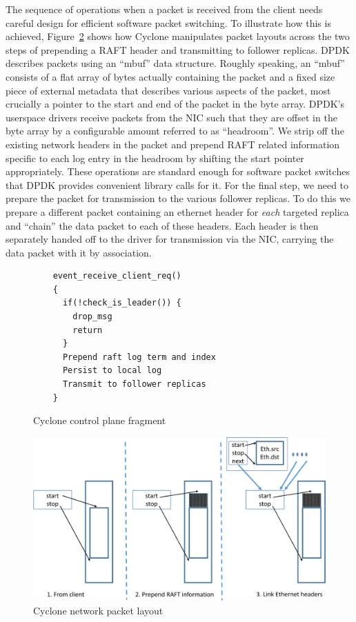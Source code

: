 \documentclass[pageno]{jpaper}
\begin{document}
The sequence of operations when a packet is received from the client needs
careful design for efficient software packet switching. To illustrate how this
is achieved, Figure~\ref{fig:packet_layout} shows how Cyclone manipulates packet
layouts across the two steps of prepending a RAFT header and transmitting to
follower replicas. DPDK describes packets using an ``mbuf'' data
structure. Roughly speaking, an ``mbuf'' consists of a flat array of bytes
actually containing the packet and a fixed size piece of external metadata that
describes various aspects of the packet, most crucially a pointer to the start
and end of the packet in the byte array. DPDK's userspace drivers receive
packets from the NIC such that they are offset in the byte array by a
configurable amount referred to as ``headroom''. We strip off the existing
network headers in the packet and prepend RAFT related information specific to
each log entry in the headroom by shifting the start pointer appropriately.
These operations are standard enough for software packet switches that DPDK
provides convenient library calls for it. For the final step, we need to prepare
the packet for transmission to the various follower replicas. To do this we
prepare a different packet containing an ethernet header for \emph{each}
targeted replica and ``chain'' the data packet to each of these headers. Each
header is then separately handed off to the driver for transmission via the NIC,
carrying the data packet with it by association.

\begin{figure}
\begin{verbatim}
    event_receive_client_req()
    {
      if(!check_is_leader()) {
        drop_msg
        return
      }
      Prepend raft log term and index
      Persist to local log
      Transmit to follower replicas
    }
\end{verbatim}
\caption{Cyclone control plane fragment}
\label{fig:control_plane}
\end{figure}

\begin{figure}
  \centering
  \includegraphics[scale=0.35]{figures2/network_packet.pdf}
  \caption{Cyclone network packet layout}
  \label{fig:packet_layout}
\end{figure}
\end{document}
